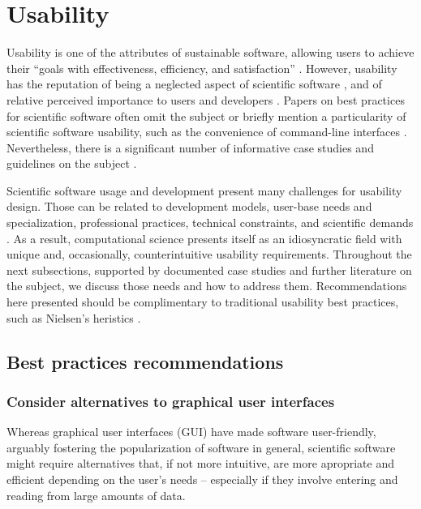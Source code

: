 \section{Usability}
\label{sec:usability}

Usability is one of the attributes of sustainable software, allowing users to achieve their “goals with effectiveness, efficiency, and satisfaction” \cite[p.3]{Venters_WSSSPE}. However, usability has the reputation of being a neglected aspect of scientific software \cite{Ahmed:2014}, and of relative perceived importance to users and developers \cite{Nguyen-Hoan:2010, Hucka:2016}. Papers on best practices for scientific software often omit the subject \cite{Stodden_WSSSPE, Wilson:2016} or briefly mention a particularity of scientific software usability, such as the convenience of command-line interfaces \cite{bestprSC}. Nevertheless, there is a significant number of informative case studies and guidelines on the subject \cite{MacLeod:1992, Springmeyer:1993, Pancake:1996, Javahery:2004, Schraefel:2004,Letondal:2004, Talbott:2005, Macaulay:2009, DeRoure:2009, Keefe:2010, DeMatos:2013, Ahmed:2014, Beg:2016}.

Scientific software usage and development present many challenges for usability design. Those can be related to development models, user-base needs and specialization, professional practices, technical constraints, and scientific demands \cite{Queiroz:2016}. As a result, computational science presents itself as an idiosyncratic field with unique and, occasionally, counterintuitive usability requirements. Throughout the next subsections, supported by documented case studies and further literature on the subject, we discuss those needs and how to address them. Recommendations here presented should be complimentary to traditional usability best practices, such as Nielsen's heristics \cite{Nielsen:1994}.

\subsection{Best practices recommendations}

\subsubsection{Consider alternatives to graphical user interfaces}

Whereas graphical user interfaces (GUI) have made software user-friendly, arguably fostering the popularization of software in general, scientific software might require alternatives that, if not more intuitive, are more apropriate and efficient depending on the user's needs – especially if they involve entering and reading from large amounts of data.  
 

